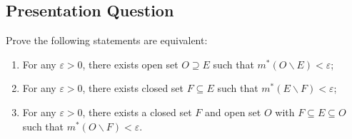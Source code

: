 \documentclass[class=book, crop=false]{standalone}
\begin{document}
    \subsection{Presentation Question}
    \begin{question}
        Prove the following statements are equivalent:
        \begin{enumerate}
            \item For any $\varepsilon > 0$, there exists open set $O \supseteq E$ such that $m^*(O \backslash E) < \varepsilon$;
            \item For any $\varepsilon > 0$, there exists closed set $F \subseteq E$ such that $m^*(E \backslash F) < \varepsilon$;
            \item For any $\varepsilon > 0$, there exists a closed set $F$ and open set $O$ with $F \subseteq E \subseteq O$ such that $m^*(O \backslash F) < \varepsilon$.
        \end{enumerate}
    \end{question}
\end{document}

